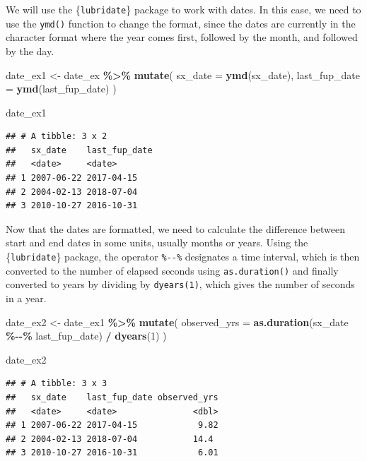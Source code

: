 \documentclass[
]{book}
\newenvironment{Shaded}{\begin{snugshade}}{\end{snugshade}}
\newcommand{\AttributeTok}[1]{\textcolor[rgb]{0.13,0.29,0.53}{#1}}
\newcommand{\DecValTok}[1]{\textcolor[rgb]{0.00,0.00,0.81}{#1}}
\newcommand{\FunctionTok}[1]{\textcolor[rgb]{0.13,0.29,0.53}{\textbf{#1}}}
\newcommand{\NormalTok}[1]{#1}
\newcommand{\OtherTok}[1]{\textcolor[rgb]{0.56,0.35,0.01}{#1}}
\newcommand{\SpecialCharTok}[1]{\textcolor[rgb]{0.81,0.36,0.00}{\textbf{#1}}}
\begin{document}
We will use the \{\texttt{lubridate}\} package to work with dates. In this case, we need to use the \texttt{ymd()} function to change the format, since the dates are currently in the character format where the year comes first, followed by the month, and followed by the day.

\begin{Shaded}
\begin{Highlighting}[]
\NormalTok{date\_ex1 }\OtherTok{\textless{}{-}}
\NormalTok{  date\_ex }\SpecialCharTok{\%\textgreater{}\%} 
  \FunctionTok{mutate}\NormalTok{(}
    \AttributeTok{sx\_date =} \FunctionTok{ymd}\NormalTok{(sx\_date), }
    \AttributeTok{last\_fup\_date =} \FunctionTok{ymd}\NormalTok{(last\_fup\_date)}
\NormalTok{    )}

\NormalTok{date\_ex1}
\end{Highlighting}
\end{Shaded}

\begin{verbatim}
## # A tibble: 3 x 2
##   sx_date    last_fup_date
##   <date>     <date>       
## 1 2007-06-22 2017-04-15   
## 2 2004-02-13 2018-07-04   
## 3 2010-10-27 2016-10-31
\end{verbatim}

Now that the dates are formatted, we need to calculate the difference between start and end dates in some units, usually months or years. Using the \{\texttt{lubridate}\} package, the operator \texttt{\%-\/-\%} designates a time interval, which is then converted to the number of elapsed seconds using \texttt{as.duration()} and finally converted to years by dividing by \texttt{dyears(1)}, which gives the number of seconds in a year.

\begin{Shaded}
\begin{Highlighting}[]
\NormalTok{date\_ex2 }\OtherTok{\textless{}{-}}
\NormalTok{  date\_ex1 }\SpecialCharTok{\%\textgreater{}\%} 
  \FunctionTok{mutate}\NormalTok{(}
    \AttributeTok{observed\_yrs =} \FunctionTok{as.duration}\NormalTok{(sx\_date }\SpecialCharTok{\%{-}{-}\%}\NormalTok{ last\_fup\_date) }\SpecialCharTok{/} \FunctionTok{dyears}\NormalTok{(}\DecValTok{1}\NormalTok{)}
\NormalTok{    )}

\NormalTok{date\_ex2}
\end{Highlighting}
\end{Shaded}

\begin{verbatim}
## # A tibble: 3 x 3
##   sx_date    last_fup_date observed_yrs
##   <date>     <date>               <dbl>
## 1 2007-06-22 2017-04-15            9.82
## 2 2004-02-13 2018-07-04           14.4 
## 3 2010-10-27 2016-10-31            6.01
\end{verbatim}
\end{document}
